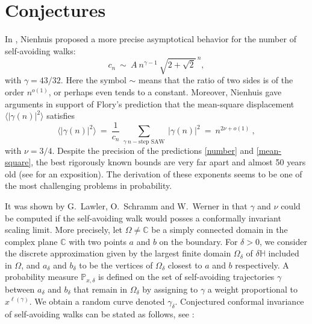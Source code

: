 \documentclass[a4paper,oneside,12pt]{article}
\begin{document}
\section{Conjectures}

In \cite{Nienhuis,Nienhuis-jsp}, Nienhuis proposed a more precise 
asymptotical behavior for the number of self-avoiding walks:
\begin{equation}\label{number}c_n~\sim~ A~n^{\gamma-1}~\sqrt{2+\sqrt 2}^{~n},\end{equation}
with $\gamma=43/32$. 
Here the symbol $\sim$ means that the ratio of two sides 
is of the order $n^{o(1)}$, or perhaps even tends to a constant.
Moreover, Nienhuis gave arguments in support of Flory's prediction
that the
mean-square displacement $\langle |\gamma(n)|^2\rangle$ satisfies
\begin{equation}\label{mean-square}\langle |\gamma(n)|^2\rangle~=~\frac1{c_n}~\sum_{\gamma~n-\text{step SAW}}~|\gamma(n)|^2~=~n^{2\nu+o(1)}~,\end{equation} 
with $\nu=3/4$. 
Despite the precision of the predictions \eqref{number} and \eqref{mean-square}, the best rigorously known bounds are very far apart and almost 50 years old (see \cite{MadrasSlade} for an exposition). The derivation of these exponents seems to be 
one of the most challenging problems in probability. 

It was shown by G.~Lawler, O.~Schramm and W.~Werner in \cite{LawlerSchrammWerner} that $\gamma$ and $\nu$ could be computed 
if the  self-avoiding walk would posses a conformally invariant scaling limit. 
More precisely, let $\Omega\neq \mathbb C$ be a simply connected domain in the complex plane $\mathbb C$ with two points $a$ and $b$ on the boundary. For $\delta>0$, we consider the discrete approximation given by the largest finite domain $\Omega_\delta$ of $\delta\mathbb H$ included in $\Omega$, and $a_\delta$ and $b_\delta$ to be the vertices of $\Omega_\delta$ closest to $a$ and $b$ respectively. A probability measure $\mathbb P_{x,\delta}$ is defined on the set of self-avoiding trajectories $\gamma$ between $a_\delta$ and $b_\delta$ that remain in $\Omega_\delta$ by assigning to $\gamma$ a weight proportional to $x^{\ell(\gamma)}$. We obtain a random 
curve denoted $\gamma_\delta$. Conjectured conformal invariance of self-avoiding walks 
can be stated as follows, see \cite{LawlerSchrammWerner}:
\end{document}
